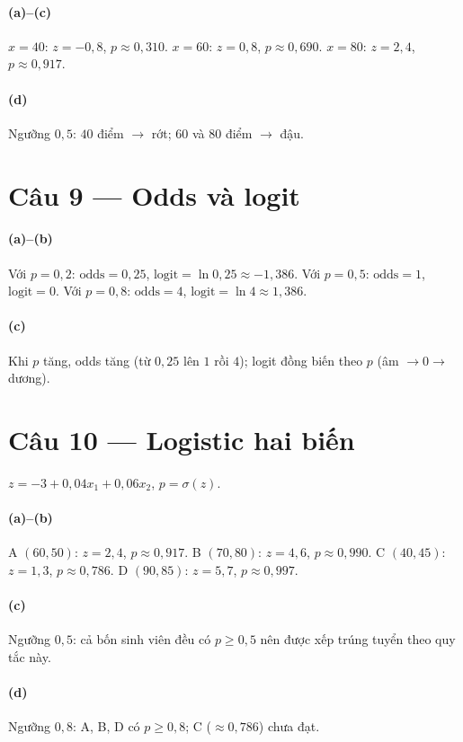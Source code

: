 \paragraph{(a)--(c)} $x=40$: $z=-0{,}8$, $p\approx 0{,}310$. $x=60$: $z=0{,}8$, $p\approx 0{,}690$. $x=80$: $z=2{,}4$, $p\approx 0{,}917$.

\paragraph{(d)} Ngưỡng $0{,}5$: $40$ điểm $\rightarrow$ rớt; $60$ và $80$ điểm $\rightarrow$ đậu.

\section*{Câu 9 --- Odds và logit}
\paragraph{(a)--(b)} Với $p=0{,}2$: $\text{odds}=0{,}25$, $\text{logit}=\ln 0{,}25\approx -1{,}386$.
Với $p=0{,}5$: $\text{odds}=1$, $\text{logit}=0$.
Với $p=0{,}8$: $\text{odds}=4$, $\text{logit}=\ln 4\approx 1{,}386$.

\paragraph{(c)} Khi $p$ tăng, odds tăng (từ $0{,}25$ lên $1$ rồi $4$); logit đồng biến theo $p$ (âm $\rightarrow 0\rightarrow$ dương).

\section*{Câu 10 --- Logistic hai biến}
$z=-3+0{,}04x_1+0{,}06x_2$, $p=\sigma(z)$.

\paragraph{(a)--(b)} A $(60,50)$: $z=2{,}4$, $p\approx 0{,}917$. B $(70,80)$: $z=4{,}6$, $p\approx 0{,}990$. C $(40,45)$: $z=1{,}3$, $p\approx 0{,}786$. D $(90,85)$: $z=5{,}7$, $p\approx 0{,}997$.

\paragraph{(c)} Ngưỡng $0{,}5$: cả bốn sinh viên đều có $p\ge 0{,}5$ nên được xếp trúng tuyển theo quy tắc này.

\paragraph{(d)} Ngưỡng $0{,}8$: A, B, D có $p\ge 0{,}8$; C ($\approx 0{,}786$) chưa đạt.

